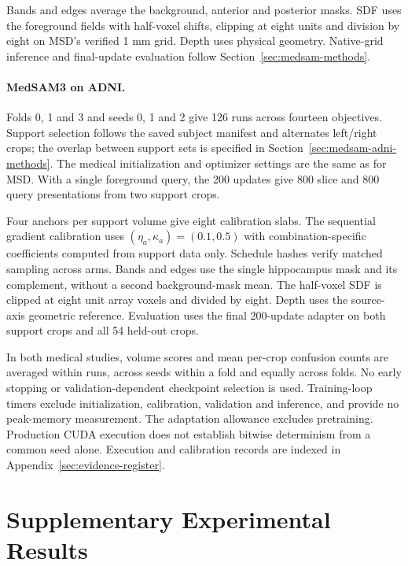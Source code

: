 \documentclass[12pt,a4paper]{article}
\begin{document}
Bands and edges average the background, anterior and posterior masks.
SDF uses the foreground fields with half-voxel shifts, clipping at eight
units and division by eight on MSD's verified 1 mm grid. Depth uses
physical geometry. Native-grid inference and final-update evaluation
follow Section~\ref{sec:medsam-methods}.

\paragraph{MedSAM3 on ADNI.}\label{sec:medsam-adni-methods-details}
Folds 0, 1 and 3 and seeds 0, 1 and 2 give 126 runs across fourteen
objectives. Support selection follows the saved subject manifest and
alternates left/right crops; the overlap between support sets is
specified in Section~\ref{sec:medsam-adni-methods}. The medical
initialization and optimizer settings are the same as for MSD.
With a single foreground query, the 200 updates give 800 slice and
800 query presentations from two support crops.

Four anchors per support volume give eight calibration slabs.
The sequential gradient calibration uses
$(\eta_a,\kappa_a)=(0.1,0.5)$ with combination-specific coefficients
computed from support data only. Schedule hashes verify matched
sampling across arms. Bands and edges use the single hippocampus
mask and its complement, without a second background-mask mean.
The half-voxel SDF is clipped at eight unit array voxels and divided
by eight. Depth uses the source-axis geometric reference.
Evaluation uses the final 200-update adapter on both support crops
and all 54 held-out crops.

In both medical studies, volume scores and mean per-crop confusion
counts are averaged within runs, across seeds within a fold and
equally across folds. No early stopping or validation-dependent
checkpoint selection is used. Training-loop timers exclude
initialization, calibration, validation and inference, and provide no
peak-memory measurement. The adaptation allowance excludes pretraining.
Production CUDA execution does not establish bitwise determinism from
a common seed alone. Execution and calibration records are indexed in
Appendix~\ref{sec:evidence-register}.

\clearpage
\section{Supplementary Experimental Results}
\label{sec:extended-results}
\end{document}
